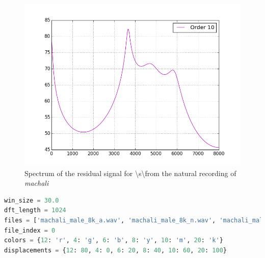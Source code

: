 \documentclass[a4paper]{article}
\begin{document}
\begin{figure}[h!]
    \includegraphics[width=\linewidth]{./images/res_spec_s.png}
    \caption{Spectrum of the residual signal for \textbackslash s\textbackslash from the natural recording of \textit{machali}}
    \label{fig:1}
\end{figure}


\begin{lstlisting}[language=Python, caption=hparams.py]
win_size = 30.0
dft_length = 1024
files = ['machali_male_8k_a.wav', 'machali_male_8k_n.wav', 'machali_male_8k_i.wav', 'machali_male_16k_s.wav']
file_index = 0
colors = {12: 'r', 4: 'g', 6: 'b', 8: 'y', 10: 'm', 20: 'k'}
displacements = {12: 80, 4: 0, 6: 20, 8: 40, 10: 60, 20: 100}
\end{lstlisting}
\end{document}
